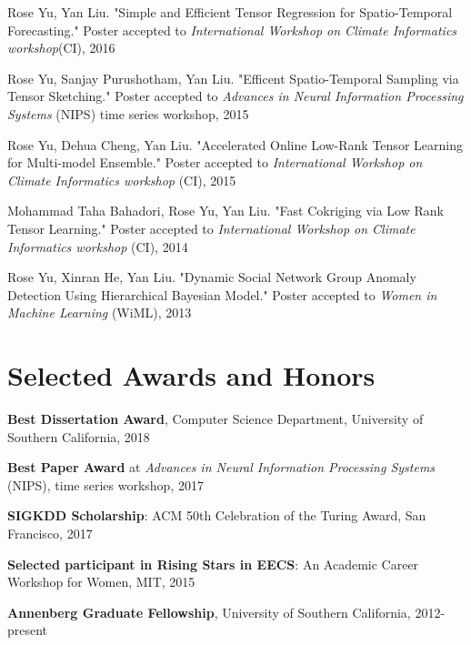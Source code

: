 \documentclass[margin,line]{res}
\begin{document}
\begin{resume}
\begin{enumerate}[label={[W\arabic*]}]
\item Rose Yu, Yan Liu. "Simple and Efficient Tensor Regression for Spatio-Temporal Forecasting." Poster accepted to \textit{International Workshop on Climate Informatics workshop}(CI), 2016

\item Rose Yu, Sanjay Purushotham, Yan Liu. "Efficent Spatio-Temporal Sampling via Tensor Sketching." Poster accepted to \textit{Advances in Neural Information Processing Systems}  (NIPS) time series workshop, 2015   


\item Rose Yu, Dehua Cheng, Yan Liu. "Accelerated Online Low-Rank Tensor Learning for Multi-model Ensemble." Poster accepted to \textit{International Workshop on Climate Informatics workshop} (CI), 2015

\item Mohammad Taha Bahadori, Rose Yu, Yan Liu. "Fast Cokriging via Low Rank Tensor Learning." Poster accepted to \textit{International Workshop on Climate Informatics workshop} (CI), 2014

Rose Yu, Xinran He, Yan Liu. "Dynamic Social Network Group Anomaly Detection Using Hierarchical Bayesian Model." Poster accepted to \textit{Women in Machine Learning } (WiML), 2013
\end{enumerate}

\section{\sc Selected Awards and Honors} 

\textbf{Best Dissertation Award}, Computer Science Department, University of Southern California, 2018

\textbf{Best Paper Award} at \textit{Advances in Neural Information Processing Systems} (NIPS), time series workshop, 2017

\textbf{SIGKDD Scholarship}: ACM 50th Celebration of the Turing Award, San Francisco, 2017

\textbf{Selected participant in Rising Stars in EECS}: An Academic Career Workshop for Women, MIT, 2015

\textbf{Annenberg Graduate Fellowship}, University of Southern California, 2012-present






\end{resume}
\end{document}
